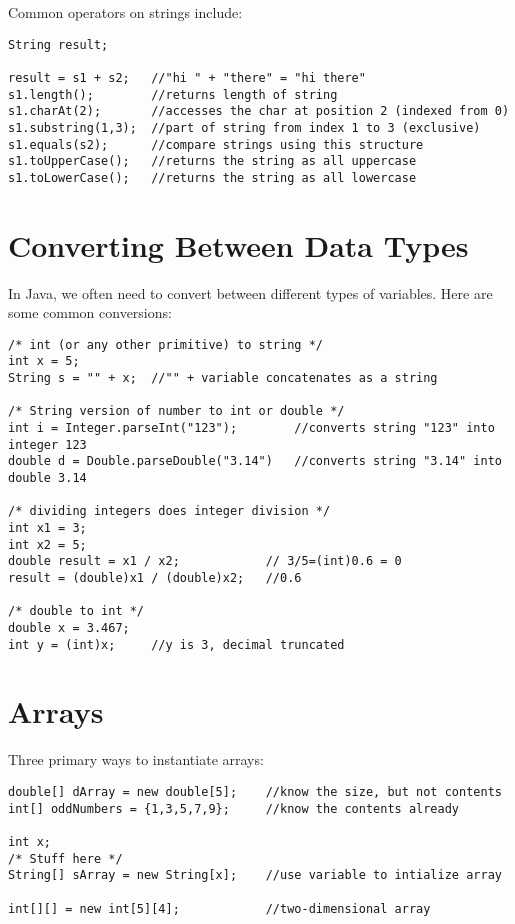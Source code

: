 \documentclass[paper=a4, fontsize=11pt, parskip=full]{scrartcl} %
\numberwithin{equation}{section} %
\numberwithin{figure}{section} %
\numberwithin{table}{section} %
\begin{document}
Common operators on strings include:

\begin{lstlisting}
String result;

result = s1 + s2; 	//"hi " + "there" = "hi there"
s1.length();		//returns length of string
s1.charAt(2);		//accesses the char at position 2 (indexed from 0)
s1.substring(1,3);	//part of string from index 1 to 3 (exclusive)
s1.equals(s2);		//compare strings using this structure
s1.toUpperCase();	//returns the string as all uppercase
s1.toLowerCase();	//returns the string as all lowercase
\end{lstlisting}

\section{Converting Between Data Types}

In Java, we often need to convert between different types of variables. Here are some common conversions:

\begin{lstlisting}
/* int (or any other primitive) to string */
int x = 5;
String s = "" + x;	//"" + variable concatenates as a string

/* String version of number to int or double */
int i = Integer.parseInt("123");		//converts string "123" into integer 123
double d = Double.parseDouble("3.14")	//converts string "3.14" into double 3.14

/* dividing integers does integer division */
int x1 = 3;
int x2 = 5;
double result = x1 / x2; 			// 3/5=(int)0.6 = 0
result = (double)x1 / (double)x2;	//0.6

/* double to int */
double x = 3.467;
int y = (int)x;		//y is 3, decimal truncated
\end{lstlisting}


\section{Arrays}

Three primary ways to instantiate arrays:

\begin{lstlisting}
double[] dArray = new double[5];	//know the size, but not contents
int[] oddNumbers = {1,3,5,7,9};		//know the contents already

int x;
/* Stuff here */
String[] sArray = new String[x];	//use variable to intialize array

int[][] = new int[5][4];			//two-dimensional array
\end{lstlisting}
\end{document}
